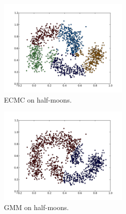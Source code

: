 \documentclass[conference]{IEEEtran}
\begin{document}
\begin{figure}[th]
\centering
\includegraphics[width=15pc]{ECMC_half-moons.pdf}
\caption{ECMC on half-moons.}
\label{ECMC_halfmoons}
\end{figure}

\begin{figure}[th]
\centering
\includegraphics[width=15pc]{GMM_half-moons.pdf}
\caption{GMM on half-moons.}
\label{GMM_halfmoons}
\end{figure}
\end{document}
